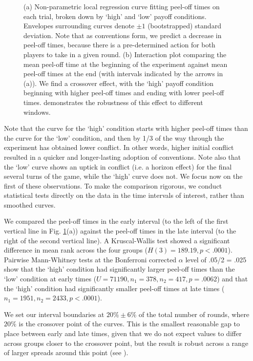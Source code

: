 \documentclass[10pt,letterpaper]{article}
\begin{document}
\begin{figure}[t]
\centering
\caption{(a) Non-parametric local regression curve fitting peel-off times on each trial, broken down by `high' and `low' payoff conditions. Envelopes surrounding curves denote $\pm 1$ (bootstrapped) standard deviation. Note that as conventions form, we predict a decrease in peel-off times, because there is a pre-determined action for both players to take in a given round. (b) Interaction plot comparing the mean peel-off time at the beginning of the experiment against mean peel-off times at the end (with intervals indicated by the arrows in (a)). We find a crossover effect, with the `high' payoff condition beginning with higher peel-off times and ending with lower peel-off times.  demonstrates the robustness of this effect to different windows.}
\label{Fig3}
\end{figure}

Note that the curve for the `high' condition starts with higher peel-off times than the curve for the `low' condition, and then by 1/3 of the way through the experiment has obtained lower conflict. In other words, higher initial conflict resulted in a quicker and longer-lasting adoption of conventions. Note also that the `low' curve shows an uptick in conflict (i.e. a horizon effect) for the final several turns of the game, while the `high' curve does not. We focus now on the first of these observations. To make the comparison rigorous, we conduct statistical tests directly on the data in the time intervals of interest, rather than smoothed curves.

We compared the peel-off times in the early interval (to the left of the first vertical line in Fig. \ref{Fig3}(a)) against the peel-off times in the late interval (to the right of the second vertical line). A Kruscal-Wallis test showed a significant difference in mean rank across the four groups ($H(3) = 189.19, p < .0001$). Pairwise Mann-Whitney tests at the Bonferroni corrected $\alpha$ level of .05/2 = .025 show that the `high' condition had significantly larger peel-off times than the `low' condition at early times ($U = 71190, n_1 =378, n_2 =417, p = .0062$) and that the `high' condition had significantly smaller peel-off times at late times ($n_1 = 1951, n_2 = 2433, p < .0001$). 

We set our interval boundaries at $20\% \pm 6\%$ of the total number of rounds, where $20\%$ is the crossover point of the curves. This is the smallest reasonable gap to place between early and late times, given that we do not expect values to differ across groups closer to the crossover point, but the result is robust across a range of larger spreads around this point (see  ). 
\end{document}
